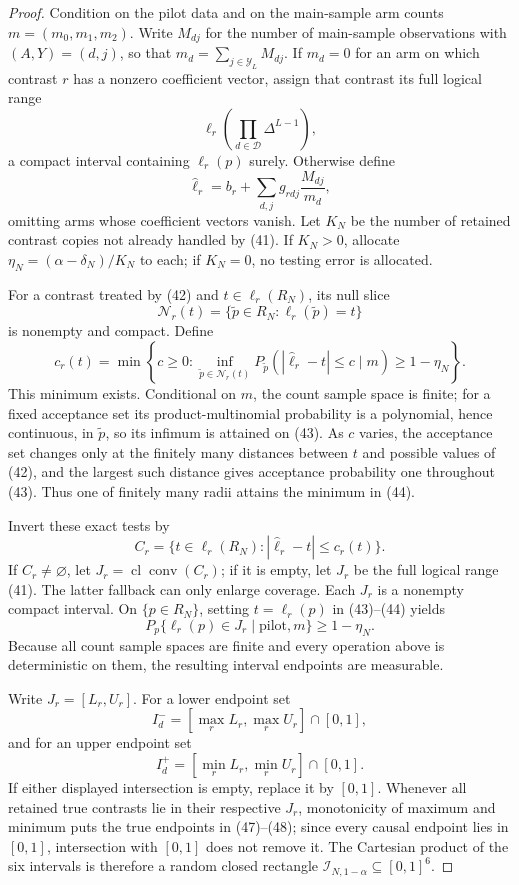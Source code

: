 \documentclass{article}
\begin{document}
\begin{proof}
Condition on the pilot data and on the main-sample arm counts \(m=(m_0,m_1,m_2)\).  Write \(M_{dj}\) for the number of main-sample observations with \((A,Y)=(d,j)\), so that \(m_d=\sum_{j\in\mathcal Y_L}M_{dj}\).  If \(m_d=0\) for an arm on which contrast \(r\) has a nonzero coefficient vector, assign that contrast its full logical range
\[
 \ell_r\!\left(\prod_{d\in\mathcal D}\Delta^{L-1}\right),                 \tag{41}
\]
a compact interval containing \(\ell_r(p)\) surely.  Otherwise define
\[
 \widehat\ell_r=b_r+\sum_{d,j}g_{rdj}\frac{M_{dj}}{m_d},                   \tag{42}
\]
omitting arms whose coefficient vectors vanish.  Let \(K_N\) be the number of retained contrast copies not already handled by (41).  If \(K_N>0\), allocate \(\eta_N=(\alpha-\delta_N)/K_N\) to each; if \(K_N=0\), no testing error is allocated.

For a contrast treated by (42) and \(t\in\ell_r(R_N)\), its null slice
\[
 \mathcal N_r(t)=\{\widetilde p\in R_N:\ell_r(\widetilde p)=t\}            \tag{43}
\]
is nonempty and compact.  Define
\[
 c_r(t)=\min\left\{c\geq0:
 \inf_{\widetilde p\in\mathcal N_r(t)}
 P_{\widetilde p}\left(|\widehat\ell_r-t|\leq c\mid m\right)
 \geq1-\eta_N\right\}.                                                     \tag{44}
\]
This minimum exists.  Conditional on \(m\), the count sample space is finite; for a fixed acceptance set its product-multinomial probability is a polynomial, hence continuous, in \(\widetilde p\), so its infimum is attained on (43).  As \(c\) varies, the acceptance set changes only at the finitely many distances between \(t\) and possible values of (42), and the largest such distance gives acceptance probability one throughout (43).  Thus one of finitely many radii attains the minimum in (44).

Invert these exact tests by
\[
 C_r=\{t\in\ell_r(R_N):|\widehat\ell_r-t|\leq c_r(t)\}.                   \tag{45}
\]
If \(C_r\neq\varnothing\), let \(J_r=\operatorname{cl}\operatorname{conv}(C_r)\); if it is empty, let \(J_r\) be the full logical range (41).  The latter fallback can only enlarge coverage.  Each \(J_r\) is a nonempty compact interval.  On \(\{p\in R_N\}\), setting \(t=\ell_r(p)\) in (43)--(44) yields
\[
 P_p\{\ell_r(p)\in J_r\mid\text{pilot},m\}\geq1-\eta_N.                 \tag{46}
\]
Because all count sample spaces are finite and every operation above is deterministic on them, the resulting interval endpoints are measurable.

Write \(J_r=[L_r,U_r]\).  For a lower endpoint set
\[
 I_d^-=[\max_rL_r,\max_rU_r]\cap[0,1],                                    \tag{47}
\]
and for an upper endpoint set
\[
 I_d^+=[\min_rL_r,\min_rU_r]\cap[0,1].                                    \tag{48}
\]
If either displayed intersection is empty, replace it by \([0,1]\).  Whenever all retained true contrasts lie in their respective \(J_r\), monotonicity of maximum and minimum puts the true endpoints in (47)--(48); since every causal endpoint lies in \([0,1]\), intersection with \([0,1]\) does not remove it.  The Cartesian product of the six intervals is therefore a random closed rectangle \(\mathcal I_{N,1-\alpha}\subseteq[0,1]^6\).


\end{proof}
\end{document}
